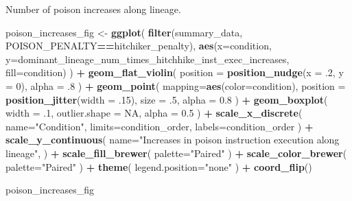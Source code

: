 \documentclass[]{book}
\newenvironment{Shaded}{\begin{snugshade}}{\end{snugshade}}
\newcommand{\DataTypeTok}[1]{\textcolor[rgb]{0.13,0.29,0.53}{#1}}
\newcommand{\DecValTok}[1]{\textcolor[rgb]{0.00,0.00,0.81}{#1}}
\newcommand{\FloatTok}[1]{\textcolor[rgb]{0.00,0.00,0.81}{#1}}
\newcommand{\KeywordTok}[1]{\textcolor[rgb]{0.13,0.29,0.53}{\textbf{#1}}}
\newcommand{\NormalTok}[1]{#1}
\newcommand{\OperatorTok}[1]{\textcolor[rgb]{0.81,0.36,0.00}{\textbf{#1}}}
\newcommand{\OtherTok}[1]{\textcolor[rgb]{0.56,0.35,0.01}{#1}}
\newcommand{\StringTok}[1]{\textcolor[rgb]{0.31,0.60,0.02}{#1}}
\begin{document}
Number of poison increases along lineage.

\begin{Shaded}
\begin{Highlighting}[]
\NormalTok{poison_increases_fig <-}\StringTok{ }\KeywordTok{ggplot}\NormalTok{(}
    \KeywordTok{filter}\NormalTok{(summary_data, POISON_PENALTY}\OperatorTok{==}\NormalTok{hitchiker_penalty),}
    \KeywordTok{aes}\NormalTok{(}\DataTypeTok{x=}\NormalTok{condition, }\DataTypeTok{y=}\NormalTok{dominant_lineage_num_times_hitchhike_inst_exec_increases, }\DataTypeTok{fill=}\NormalTok{condition)}
\NormalTok{  ) }\OperatorTok{+}
\StringTok{  }\KeywordTok{geom_flat_violin}\NormalTok{(}
    \DataTypeTok{position =} \KeywordTok{position_nudge}\NormalTok{(}\DataTypeTok{x =} \FloatTok{.2}\NormalTok{, }\DataTypeTok{y =} \DecValTok{0}\NormalTok{),}
    \DataTypeTok{alpha =} \FloatTok{.8}
\NormalTok{  ) }\OperatorTok{+}
\StringTok{  }\KeywordTok{geom_point}\NormalTok{(}
    \DataTypeTok{mapping=}\KeywordTok{aes}\NormalTok{(}\DataTypeTok{color=}\NormalTok{condition),}
    \DataTypeTok{position =} \KeywordTok{position_jitter}\NormalTok{(}\DataTypeTok{width =} \FloatTok{.15}\NormalTok{),}
    \DataTypeTok{size =} \FloatTok{.5}\NormalTok{,}
    \DataTypeTok{alpha =} \FloatTok{0.8}
\NormalTok{  ) }\OperatorTok{+}
\StringTok{  }\KeywordTok{geom_boxplot}\NormalTok{(}
    \DataTypeTok{width =} \FloatTok{.1}\NormalTok{,}
    \DataTypeTok{outlier.shape =} \OtherTok{NA}\NormalTok{,}
    \DataTypeTok{alpha =} \FloatTok{0.5}
\NormalTok{  ) }\OperatorTok{+}
\StringTok{  }\KeywordTok{scale_x_discrete}\NormalTok{(}
    \DataTypeTok{name=}\StringTok{"Condition"}\NormalTok{,}
    \DataTypeTok{limits=}\NormalTok{condition_order,}
    \DataTypeTok{labels=}\NormalTok{condition_order}
\NormalTok{  ) }\OperatorTok{+}
\StringTok{  }\KeywordTok{scale_y_continuous}\NormalTok{(}
    \DataTypeTok{name=}\StringTok{"Increases in poison instruction execution along lineage"}\NormalTok{,}
\NormalTok{  ) }\OperatorTok{+}
\StringTok{  }\KeywordTok{scale_fill_brewer}\NormalTok{(}
    \DataTypeTok{palette=}\StringTok{"Paired"}
\NormalTok{  ) }\OperatorTok{+}
\StringTok{  }\KeywordTok{scale_color_brewer}\NormalTok{(}
    \DataTypeTok{palette=}\StringTok{"Paired"}
\NormalTok{  ) }\OperatorTok{+}
\StringTok{  }\KeywordTok{theme}\NormalTok{(}
    \DataTypeTok{legend.position=}\StringTok{"none"}
\NormalTok{  ) }\OperatorTok{+}
\StringTok{  }\KeywordTok{coord_flip}\NormalTok{()}

\NormalTok{poison_increases_fig}
\end{Highlighting}
\end{Shaded}
\end{document}
